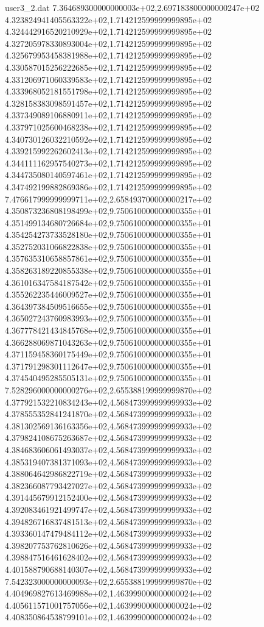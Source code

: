 \begin{filecontents}{user3_2.dat}
7.364689300000000003e+02,2.697183800000000247e+02
4.323824941405563322e+02,1.714212599999999895e+02
4.324442916520210929e+02,1.714212599999999895e+02
4.327205978330893004e+02,1.714212599999999895e+02
4.325679953458381988e+02,1.714212599999999895e+02
4.330587015256222685e+02,1.714212599999999895e+02
4.331206971060339583e+02,1.714212599999999895e+02
4.333968052181551798e+02,1.714212599999999895e+02
4.328158383098591457e+02,1.714212599999999895e+02
4.337349089106880911e+02,1.714212599999999895e+02
4.337971025600468238e+02,1.714212599999999895e+02
4.340730126032210592e+02,1.714212599999999895e+02
4.339215992262602413e+02,1.714212599999999895e+02
4.344111162957540273e+02,1.714212599999999895e+02
4.344735080140597461e+02,1.714212599999999895e+02
4.347492199882869386e+02,1.714212599999999895e+02
7.476617999999999711e+02,2.658493700000000217e+02
4.350873236808198499e+02,9.750610000000000355e+01
4.351499134680726684e+02,9.750610000000000355e+01
4.354254273733528180e+02,9.750610000000000355e+01
4.352752031066822838e+02,9.750610000000000355e+01
4.357635310658857861e+02,9.750610000000000355e+01
4.358263189220855338e+02,9.750610000000000355e+01
4.361016347584187542e+02,9.750610000000000355e+01
4.355262235446009527e+02,9.750610000000000355e+01
4.364397384509516655e+02,9.750610000000000355e+01
4.365027243760983993e+02,9.750610000000000355e+01
4.367778421434845768e+02,9.750610000000000355e+01
4.366288069871043263e+02,9.750610000000000355e+01
4.371159458360175449e+02,9.750610000000000355e+01
4.371791298301112647e+02,9.750610000000000355e+01
4.374540495285505131e+02,9.750610000000000355e+01
7.528296000000000276e+02,2.655388199999999870e+02
4.377921532210834243e+02,4.568473999999999933e+02
4.378555352841241870e+02,4.568473999999999933e+02
4.381302569136163356e+02,4.568473999999999933e+02
4.379824108675263687e+02,4.568473999999999933e+02
4.384683606061493037e+02,4.568473999999999933e+02
4.385319407381371093e+02,4.568473999999999933e+02
4.388064642986822719e+02,4.568473999999999933e+02
4.382366087793427027e+02,4.568473999999999933e+02
4.391445679912152400e+02,4.568473999999999933e+02
4.392083461921499747e+02,4.568473999999999933e+02
4.394826716837481513e+02,4.568473999999999933e+02
4.393360147479484112e+02,4.568473999999999933e+02
4.398207753762810626e+02,4.568473999999999933e+02
4.398847516461628402e+02,4.568473999999999933e+02
4.401588790688140307e+02,4.568473999999999933e+02
7.542323000000000093e+02,2.655388199999999870e+02
4.404969827613469988e+02,1.463999000000000024e+02
4.405611571001757056e+02,1.463999000000000024e+02
4.408350864538799101e+02,1.463999000000000024e+02

\end{filecontents}
